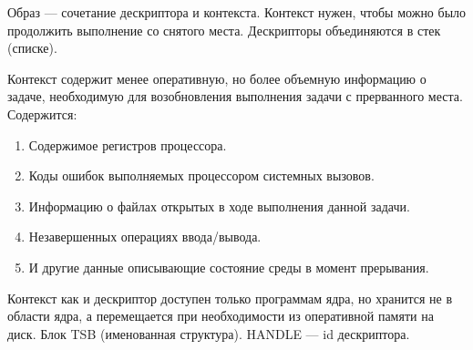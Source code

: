 Образ --- сочетание дескриптора и контекста. Контекст нужен, чтобы можно было
продолжить выполнение со снятого места. Дескрипторы объединяются в стек (списке).
\par

Контекст содержит менее оперативную, но более объемную информацию о задаче,
необходимую для возобновления выполнения задачи с прерванного места. Содержится:
\begin{enumerate}
  \item Содержимое регистров процессора.
  \item Коды ошибок выполняемых процессором системных вызовов.
  \item Информацию о файлах открытых в ходе выполнения данной задачи.
  \item Незавершенных операциях ввода/вывода.
  \item И другие данные описывающие состояние среды в момент прерывания.
\end{enumerate}

Контекст как и дескриптор доступен только программам ядра, но хранится не в
области ядра, а перемещается при необходимости из оперативной памяти на диск.
Блок TSB (именованная структура).
HANDLE --- id дескриптора.
